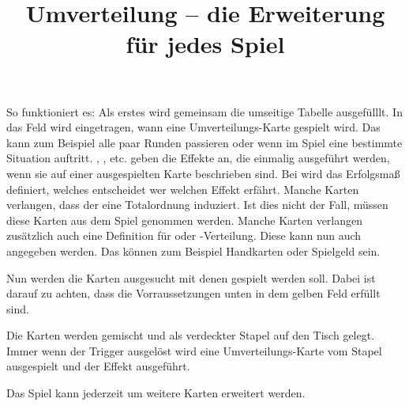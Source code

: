 \documentclass[a4paper]{article}
\title{Umverteilung -- die Erweiterung für jedes Spiel}
\date{}
\begin{document}
\maketitle
\large
So funktioniert es:
Als erstes wird gemeinsam die umseitige Tabelle ausgefülllt.
In das Feld  wird eingetragen, wann eine Umverteilungs-Karte gespielt wird.
Das kann zum Beispiel alle paar Runden passieren oder wenn im Spiel eine bestimmte Situation auftritt.
\bonusA{}, \malusA{}, etc. geben die Effekte an, die einmalig ausgeführt werden, wenn sie auf einer ausgespielten Karte beschrieben sind.
Bei \status{} wird das Erfolgsmaß definiert, welches entscheidet wer welchen Effekt erfährt.
Manche Karten verlangen, dass der \status{} eine Totalordnung induziert.
Ist dies nicht der Fall, müssen diese Karten aus dem Spiel genommen werden.
Manche Karten verlangen zusätzlich auch eine Definition für \kapital{} oder \kapital{}-Verteilung.
Diese kann nun auch angegeben werden.
Das können zum Beispiel Handkarten oder Spielgeld sein.

Nun werden die Karten ausgesucht mit denen gespielt werden soll.
Dabei ist darauf zu achten, dass die Vorraussetzungen unten in dem gelben Feld erfüllt sind.

Die Karten werden gemischt und als verdeckter Stapel auf den Tisch gelegt.
Immer wenn der Trigger ausgelöst wird eine Umverteilungs-Karte vom Stapel ausgespielt und der Effekt ausgeführt.

Das Spiel kann jederzeit um weitere Karten erweitert werden.
\end{document}
